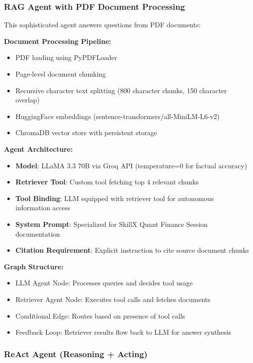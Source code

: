 \documentclass[12pt,a4paper]{article}
\begin{document}
\subsubsection{RAG Agent with PDF Document Processing}

This sophisticated agent answers questions from PDF documents:

\textbf{Document Processing Pipeline:}
\begin{itemize}
    \item PDF loading using PyPDFLoader
    \item Page-level document chunking
    \item Recursive character text splitting (800 character chunks, 150 character overlap)
    \item HuggingFace embeddings (sentence-transformers/all-MiniLM-L6-v2)
    \item ChromaDB vector store with persistent storage
\end{itemize}

\textbf{Agent Architecture:}
\begin{itemize}
    \item \textbf{Model}: LLaMA 3.3 70B via Groq API (temperature=0 for factual accuracy)
    \item \textbf{Retriever Tool}: Custom tool fetching top 4 relevant chunks
    \item \textbf{Tool Binding}: LLM equipped with retriever tool for autonomous information access
    \item \textbf{System Prompt}: Specialized for SkillX Quant Finance Session documentation
    \item \textbf{Citation Requirement}: Explicit instruction to cite source document chunks
\end{itemize}

\textbf{Graph Structure:}
\begin{itemize}
    \item LLM Agent Node: Processes queries and decides tool usage
    \item Retriever Agent Node: Executes tool calls and fetches documents
    \item Conditional Edge: Routes based on presence of tool calls
    \item Feedback Loop: Retriever results flow back to LLM for answer synthesis
\end{itemize}

\subsubsection{ReAct Agent (Reasoning + Acting)}
\end{document}
